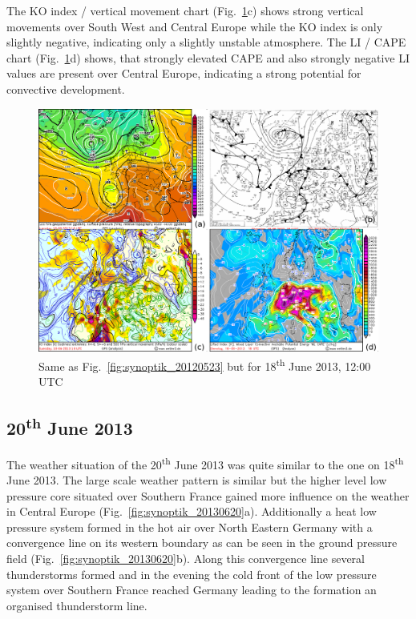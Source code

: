 The KO index / vertical movement chart (Fig.~\ref{fig:synoptik_20130618}c) shows strong vertical movements over South West and Central Europe while the KO index is only slightly negative, indicating only a slightly unstable atmosphere. The LI / CAPE chart (Fig.~\ref{fig:synoptik_20130618}d) shows, that strongly elevated CAPE and also strongly negative LI values are present over Central Europe, indicating a strong potential for convective development.

\begin{figure}[htbp]
	\centering
	\includegraphics[width=0.8\linewidth]{Grafiken/Abbildungen/synoptik_20130618.png}
	\caption{Same as Fig.~\ref{fig:synoptik_20120523} but for 18\textsuperscript{th} June 2013, 12:00 UTC}
    \label{fig:synoptik_20130618}  
\end{figure}


\subsection{20\textsuperscript{th} June 2013}
The weather situation of the 20\textsuperscript{th} June 2013 was quite similar to the one on 18\textsuperscript{th} June 2013. The large scale weather pattern is similar but the higher level low pressure core situated over Southern France gained more influence on the weather in Central Europe (Fig.~\ref{fig:synoptik_20130620}a). Additionally a heat low pressure system formed in the hot air over North Eastern Germany with a convergence line on its western boundary as can be seen in the ground pressure field (Fig.~\ref{fig:synoptik_20130620}b). Along this convergence line several thunderstorms formed and in the evening the cold front of the low pressure system over Southern France reached Germany leading to the formation an organised thunderstorm line.

